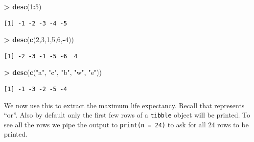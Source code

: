 \documentclass[
]{krantz}
\makeatletter
\newenvironment{Shaded}{\begin{snugshade}}{\end{snugshade}}
\newcommand{\DecValTok}[1]{\textcolor[rgb]{0.06,0.06,0.06}{#1}}
\newcommand{\KeywordTok}[1]{\textcolor[rgb]{0.27,0.27,0.27}{\textbf{#1}}}
\newcommand{\NormalTok}[1]{#1}
\newcommand{\OperatorTok}[1]{\textcolor[rgb]{0.43,0.43,0.43}{\textbf{#1}}}
\newcommand{\StringTok}[1]{\textcolor[rgb]{0.5,0.5,0.5}{#1}}
\newenvironment{kframe}{%
\medskip{}
\setlength{\fboxsep}{.8em}
 \def\at@end@of@kframe{}%
 \ifinner\ifhmode%
  \def\at@end@of@kframe{\end{minipage}}%
  \begin{minipage}{\columnwidth}%
 \fi\fi%
 \def\FrameCommand##1{\hskip\@totalleftmargin \hskip-\fboxsep
 \colorbox{shadecolor}{##1}\hskip-\fboxsep
     \hskip-\linewidth \hskip-\@totalleftmargin \hskip\columnwidth}%
 \MakeFramed {\advance\hsize-\width
   \@totalleftmargin\z@ \linewidth\hsize
   \@setminipage}}%
 {\par\unskip\endMakeFramed%
 \at@end@of@kframe}
\renewenvironment{Shaded}{\begin{kframe}}{\end{kframe}}
\makeatother
\begin{document}
\begin{Shaded}
\begin{Highlighting}[]
\OperatorTok{\textgreater{}}\StringTok{ }\KeywordTok{desc}\NormalTok{(}\DecValTok{1}\OperatorTok{:}\DecValTok{5}\NormalTok{)}
\end{Highlighting}
\end{Shaded}

\begin{verbatim}
[1] -1 -2 -3 -4 -5
\end{verbatim}

\begin{Shaded}
\begin{Highlighting}[]
\OperatorTok{\textgreater{}}\StringTok{ }\KeywordTok{desc}\NormalTok{(}\KeywordTok{c}\NormalTok{(}\DecValTok{2}\NormalTok{,}\DecValTok{3}\NormalTok{,}\DecValTok{1}\NormalTok{,}\DecValTok{5}\NormalTok{,}\DecValTok{6}\NormalTok{,}\OperatorTok{{-}}\DecValTok{4}\NormalTok{))}
\end{Highlighting}
\end{Shaded}

\begin{verbatim}
[1] -2 -3 -1 -5 -6  4
\end{verbatim}

\begin{Shaded}
\begin{Highlighting}[]
\OperatorTok{\textgreater{}}\StringTok{ }\KeywordTok{desc}\NormalTok{(}\KeywordTok{c}\NormalTok{(}\StringTok{"a"}\NormalTok{, }\StringTok{"c"}\NormalTok{, }\StringTok{"b"}\NormalTok{, }\StringTok{"w"}\NormalTok{, }\StringTok{"e"}\NormalTok{))}
\end{Highlighting}
\end{Shaded}

\begin{verbatim}
[1] -1 -3 -2 -5 -4
\end{verbatim}

We now use this to extract the maximum life expectancy. Recall that \texttt{\textbar{}} represents ``or''. Also by default only the first few rows of a \texttt{tibble} object will be printed. To see all the rows we pipe the output to \texttt{print(n\ =\ 24)} to ask for all 24 rows to be printed.
\end{document}
